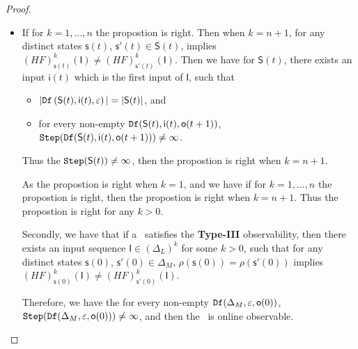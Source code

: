 \begin{appendices}
\begin{proof}
\begin{itemize}
\item If for $k=1,\ldots, n$ the propostion is right. Then when $k=n+1$, for any distinct states $\mathsf{s}(t)$, $\mathsf{s}'(t) \in \mathsf{S}(t)$, implies $(HF)^{k}_{\mathsf{s}(t)}(\mathsf{I})\neq (HF)^{k}_{\mathsf{s}'(t)}(\mathsf{I})$. Then we have for $\mathsf{S}(t)$,
 there exists an input $\mathsf{i}(t)$ which is the first input of $\mathsf{I}$, such that
 \begin{itemize}
\item  $|{\tt Df}\left(\mathsf{S}(t),\mathsf{i}(t),\varepsilon\right)|=|\mathsf{S}(t)|$, and 
 \item  for every non-empty ${\tt Df}(\mathsf{S}(t),\mathsf{i}(t),\mathsf{o}(t+1))$, ${\tt Step}({\tt Df}(\mathsf{S}(t),\mathsf{i}(t),\mathsf{o}(t+1)))\ne \infty$.
 \end{itemize}
Thus the ${\tt Step}(\mathsf{S}(t))\ne \infty$, then the propostion is right when $k =n+1$.

As the propostion is right when $k =1$, and we have if for $k=1,\ldots, n$ the propostion is right, then the propostion is right when $k=n+1$. Thus the propostion is right for any $k>0$.

Secondly, we have that if a \BCN\ satisfies the {\bf Type-III} observability, then there exists an input sequence $\mathsf{I}\in(\Delta_L)^{k}$ for some $k >0$, such that for any distinct states $\mathsf{s}(0)$, $\mathsf{s}'(0) \in \Delta_M$, $\rho(\mathsf{s}(0))=\rho(\mathsf{s}'(0))$ implies $(HF)^{k}_{\mathsf{s}(0)}(\mathsf{I})\neq (HF)^{k}_{\mathsf{s}'(0)}(\mathsf{I})$. 

Therefore, we have the for every non-empty ${\tt Df}(\Delta_M,\varepsilon, \mathsf{o}(0))$, ${\tt Step}({\tt Df}(\Delta_M,\varepsilon,\mathsf{o}(0)))\ne \infty$, and then the \BCN\ is online observable.
 \end{itemize}
\end{proof}

\end{appendices}
